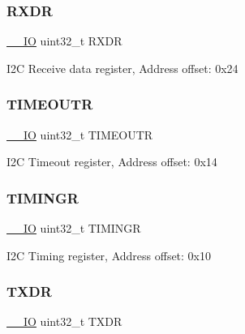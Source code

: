 \subsubsection{\texorpdfstring{R\+X\+DR}{RXDR}}
{\footnotesize\ttfamily \hyperlink{core__sc300_8h_aec43007d9998a0a0e01faede4133d6be}{\+\_\+\+\_\+\+IO} uint32\+\_\+t R\+X\+DR}

I2C Receive data register, Address offset\+: 0x24 \mbox{\label{struct_i2_c___type_def_a95187d83f061ebbddd8668d0db3fbaa5}} 
\subsubsection{\texorpdfstring{T\+I\+M\+E\+O\+U\+TR}{TIMEOUTR}}
{\footnotesize\ttfamily \hyperlink{core__sc300_8h_aec43007d9998a0a0e01faede4133d6be}{\+\_\+\+\_\+\+IO} uint32\+\_\+t T\+I\+M\+E\+O\+U\+TR}

I2C Timeout register, Address offset\+: 0x14 \mbox{\label{struct_i2_c___type_def_a5576a30ffbe0a0800ce7788610327677}} 
\subsubsection{\texorpdfstring{T\+I\+M\+I\+N\+GR}{TIMINGR}}
{\footnotesize\ttfamily \hyperlink{core__sc300_8h_aec43007d9998a0a0e01faede4133d6be}{\+\_\+\+\_\+\+IO} uint32\+\_\+t T\+I\+M\+I\+N\+GR}

I2C Timing register, Address offset\+: 0x10 \mbox{\label{struct_i2_c___type_def_ad7e8d785fff2acfeb8814e43bda8dd72}} 
\subsubsection{\texorpdfstring{T\+X\+DR}{TXDR}}
{\footnotesize\ttfamily \hyperlink{core__sc300_8h_aec43007d9998a0a0e01faede4133d6be}{\+\_\+\+\_\+\+IO} uint32\+\_\+t T\+X\+DR}

